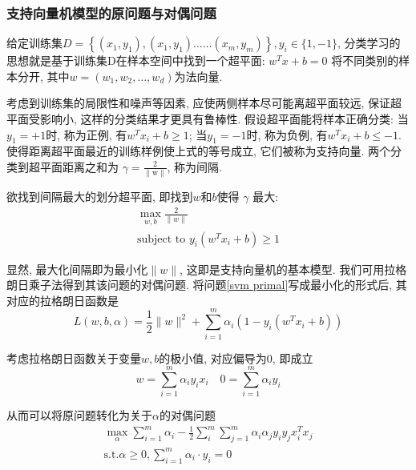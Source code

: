 \documentclass[lang=cn, 11pt,   a4paper]{elegantpaper}
\begin{document}
\subsubsection{支持向量机模型的原问题与对偶问题}
给定训练集$D=\left\{\left (x_{1},  y_{1}\right), \left (x_{1},  y_{1}\right) \ldots \ldots\left (x_{m},  y_{m}\right)\right\},  y_{i} \in\{1, -1\}$,  分类学习的思想就是基于训练集D在样本空间中找到一个超平面:  $w^{T} x+b=0$ 将不同类别的样本分开,  其中$w = (w_1,  w_2,  \dots,  w_d)$为法向量.

考虑到训练集的局限性和噪声等因素, 应使两侧样本尽可能离超平面较远, 保证超平面受影响小, 这样的分类结果才更具有鲁棒性. 假设超平面能将样本正确分类:  当$y_1 = +1$时,  称为正例,  有$w^Tx_i +b \ge 1$; 当$y_1 = -1$时,  称为负例,  有$w^Tx_i +b \le -1$. 使得距离超平面最近的训练样例使上式的等号成立, 它们被称为支持向量. 两个分类到超平面距离之和为 $\gamma=\frac{2}{\|\mathrm{w}\|}$,  称为间隔. 

欲找到间隔最大的划分超平面, 即找到$w$和$b$使得 $\gamma$ 最大: 
\begin{equation}
\label{svm primal}
\begin{array}{c}
{\max _{w,  b} \frac{2}{\|w\|}} \\
{\text {subject to } y_{i}\left (w^{T} x_{i}+b\right) \geq 1}
\end{array}
\end{equation}

显然, 最大化间隔即为最小化$\|w\|$,  这即是支持向量机的基本模型. 我们可用拉格朗日乘子法得到其该问题的对偶问题. 将问题\ref{svm primal}写成最小化的形式后,  其对应的拉格朗日函数是
\begin{equation}
L (w,  b,  \alpha)=\frac{1}{2}\|w\|^{2}+\sum_{i=1}^{m} \alpha_{i}\left (1-y_{i}\left (w^{T} x_{i}+b\right)\right)
\end{equation}

考虑拉格朗日函数关于变量$w, b$的极小值,  对应偏导为0,  即成立
\begin{equation}
w=\sum_{i=1}^{m} \alpha_{i} y_{i} x_{i} \quad 0=\sum_{i=1}^{m} \alpha_{i} y_{i}
\end{equation}

从而可以将原问题转化为关于$\alpha$的对偶问题
\begin{equation}
\begin{array}{c}
{\max _{\alpha} \sum_{i=1}^{m} \alpha_{i}-\frac{1}{2} \sum_{i}^{m} \sum_{j=1}^{m} \alpha_{i} \alpha_{j} y_{i} y_{j} x_{i}^{T} x_{j}}\\
{\text{s.t.} \alpha \geq 0,  \sum_{i=1}^{m} \alpha_{i} \cdot y_{i}=0}
\end{array}
\end{equation}
\end{document}
